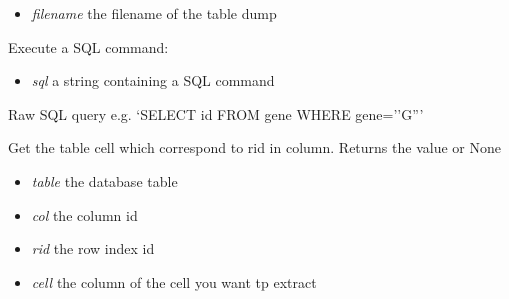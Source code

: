 \documentclass[a4paper,11pt,english]{sphinxmanual}
\begin{document}
\begin{fulllineitems}
\begin{fulllineitems}
\begin{itemize}
\item {} 
\emph{filename} the filename of the table dump

\end{itemize}

\end{fulllineitems}


\begin{fulllineitems}
\label{modules_doc:cbmpy.CBNetDB.DBTools.executeSQL}
Execute a SQL command:
\begin{itemize}
\item {} 
\emph{sql} a string containing a SQL command

\end{itemize}

\end{fulllineitems}


\begin{fulllineitems}
\label{modules_doc:cbmpy.CBNetDB.DBTools.fetchAll}
Raw SQL query e.g. `SELECT id FROM gene WHERE gene=''G'''

\end{fulllineitems}


\begin{fulllineitems}
\label{modules_doc:cbmpy.CBNetDB.DBTools.getCell}
Get the table cell which correspond to rid in column. Returns the value or None
\begin{itemize}
\item {} 
\emph{table} the database table

\item {} 
\emph{col} the column id

\item {} 
\emph{rid} the row index id

\item {} 
\emph{cell} the column of the cell you want tp extract

\end{itemize}

\end{fulllineitems}


\end{fulllineitems}
\end{document}
